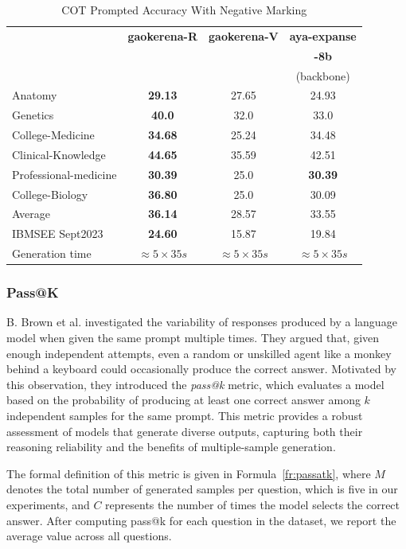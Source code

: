 \documentclass[conference]{IEEEtran}
\begin{document}
	\begin{table}[ht]
		\centering
		\caption{COT Prompted Accuracy With Negative Marking}
		\begin{tabular}{|l|c|c|c|}  
			\hline
			\textbf{} & \textbf{gaokerena-R} & \textbf{gaokerena-V} & \textbf{aya-expanse} \\ 
			& & & \textbf{-8b} \\
			&   & &(backbone)  \\ \hline
			Anatomy  & \textbf{29.13} & 27.65  & 24.93  \\ \hline
			Genetics & \textbf{40.0}  & 32.0  & 33.0  \\ \hline
			College-Medicine & \textbf{34.68}  & 25.24  & 34.48  \\ \hline
			Clinical-Knowledge & \textbf{44.65} & 35.59  & 42.51  \\ \hline
			Professional-medicine& \textbf{30.39} & 25.0 & \textbf{30.39}   \\ \hline
			College-Biology& \textbf{36.80} & 25.0  & 30.09  \\ \hline
			Average & \textbf{36.14} & 28.57  & 33.55  \\ \hline
			IBMSEE Sept2023 & \textbf{24.60}  & 15.87 & 19.84   \\ \hline
			Generation time  & $\approx 5 \times 35s$ & $\approx 5 \times 35s$ & $\approx 5 \times 35s$ \\  \hline
		\end{tabular}
		\label{tab:med_reasoning_capabillities_NM_comparison}
	\end{table}
           
           \subsubsection{Pass@K}
B. Brown et al. \cite{b24} investigated the variability of responses produced by a language model when given the same prompt multiple times. They argued that, given enough independent attempts, even a random or unskilled agent like a monkey behind a keyboard could occasionally produce the correct answer. Motivated by this observation, they introduced the \emph{pass@k} metric, which evaluates a model based on the probability of producing at least one correct answer among \(k\) independent samples for the same prompt. This metric provides a robust assessment of models that generate diverse outputs, capturing both their reasoning reliability and the benefits of multiple-sample generation.  

The formal definition of this metric is given in Formula~\ref{fr:passatk}, where \(M\) denotes the total number of generated samples per question, which is five in our experiments, and \(C\) represents the number of times the model selects the correct answer. After computing pass@k for each question in the dataset, we report the average value across all questions.
\end{document}
